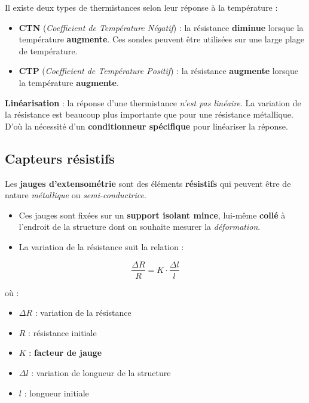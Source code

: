Il existe deux types de thermistances selon leur réponse à la température :
\begin{itemize}
    \item \textbf{CTN} (\textit{Coefficient de Température Négatif}) : la résistance \textbf{diminue} lorsque la température \textbf{augmente}. Ces sondes peuvent être utilisées sur une large plage de température.
    \item \textbf{CTP} (\textit{Coefficient de Température Positif}) : la résistance \textbf{augmente} lorsque la température \textbf{augmente}.
\end{itemize}

\textbf{Linéarisation} : la réponse d'une thermistance 
\textit{n'est pas linéaire}. La variation de la résistance est beaucoup plus 
importante que pour une résistance métallique. D'où la nécessité d'un 
\textbf{conditionneur spécifique} pour linéariser la réponse.

\subsection{Capteurs résistifs}

Les \textbf{jauges d'extensométrie} sont des éléments \textbf{résistifs} qui 
peuvent être de nature \textit{métallique} ou \textit{semi-conductrice}.  

\begin{itemize}
    \item Ces jauges sont fixées sur un \textbf{support isolant mince}, lui-même \textbf{collé} à l'endroit de la structure dont on souhaite mesurer la \textit{déformation}.
    \item La variation de la résistance suit la relation :
\end{itemize}

\begin{equation}
    \frac{\Delta R}{R} = K \cdot \frac{\Delta l}{l}
\end{equation}

où :
\begin{itemize}
    \item \( \Delta R \) : variation de la résistance
    \item \( R \) : résistance initiale
    \item \( K \) : \textbf{facteur de jauge}
    \item \( \Delta l \) : variation de longueur de la structure
    \item \( l \) : longueur initiale
\end{itemize}

